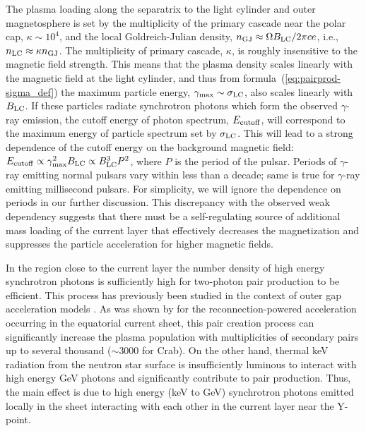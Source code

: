 The plasma loading along the separatrix to the light cylinder and outer magnetosphere is set by the multiplicity of the primary cascade near the polar cap, $\kappa\sim 10^4$, \citep{1982ApJ...252..337D,2013MNRAS.429...20T,2018arXiv180308924T} and the local Goldreich-Julian density, $n_{\rm GJ}\approx\Omega B_{\rm LC}/2\pi c e$, i.e., $n_{\rm LC}\approx \kappa n_{\rm GJ}$. The multiplicity of primary cascade, $\kappa$, is roughly insensitive to the magnetic field strength. This means that the plasma density scales linearly with the magnetic field at the light cylinder, and thus from formula~(\ref{eq:pairprod-sigma_def}) the maximum particle energy, $\gamma_{\rm max}\sim \sigma_{\rm LC}$, also scales linearly with $B_{\rm LC}$. If these particles radiate synchrotron photons which form the observed $\gamma$-ray emission, the cutoff energy of photon spectrum, $E_{\rm cutoff}$, will correspond to the maximum energy of particle spectrum set by $\sigma_{\rm LC}$. This will lead to a strong dependence of the cutoff energy on the background magnetic field: $E_{\rm cutoff}\propto \gamma_{\rm max}^2 B_{\rm LC}\propto B_{\rm LC}^3P^2$, where $P$ is the period of the pulsar. Periods of $\gamma$-ray emitting normal pulsars vary within less than a decade; same is true for $\gamma$-ray emitting millisecond pulsars. For simplicity, we will ignore the dependence on periods in our further discussion. This discrepancy with the observed weak dependency suggests that there must be a self-regulating source of additional mass loading of the current layer that effectively decreases the magnetization and suppresses the particle acceleration for higher magnetic fields.

In the region close to the current layer the number density of high energy synchrotron photons is sufficiently high for two-photon pair production to be efficient. This process has previously been studied in the context of outer gap acceleration models \citep{1996A&AS..120C..49A, 2010ApJ...715.1318T}. As was shown by \cite{1996A&A...311..172L} for the reconnection-powered acceleration occurring in the equatorial current sheet, this pair creation process can significantly increase the plasma population with multiplicities of secondary pairs up to several thousand ($\sim 3000$ for Crab). On the other hand, thermal keV radiation from the neutron star surface is insufficiently luminous to interact with high energy GeV photons and significantly contribute to pair production. Thus, the main effect is due to high energy (keV to GeV) synchrotron photons emitted locally in the sheet interacting with each other in the current layer near the Y-point.

